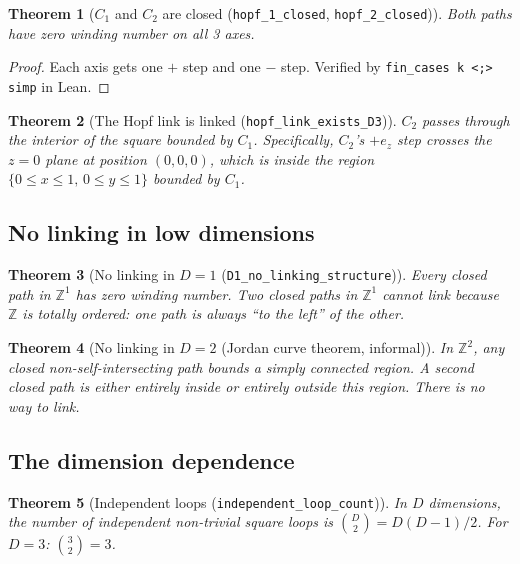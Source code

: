 \documentclass[11pt,a4paper]{article}
\theoremstyle{plain}
\newtheorem{theorem}{Theorem}[section]
\theoremstyle{definition}
\theoremstyle{remark}
\newcommand{\Z}{\mathbb{Z}}
\begin{document}
\begin{theorem}[$C_1$ and $C_2$ are closed {\normalfont(\texttt{hopf\_1\_closed}, \texttt{hopf\_2\_closed})}]
Both paths have zero winding number on all 3 axes.
\end{theorem}

\begin{proof}
Each axis gets one $+$ step and one $-$ step.
Verified by \texttt{fin\_cases k <;> simp} in Lean.
\end{proof}

\begin{theorem}[The Hopf link is linked {\normalfont(\texttt{hopf\_link\_exists\_D3})}]
\label{thm:hopf-linked}
$C_2$ passes through the interior of the square bounded by $C_1$.
Specifically, $C_2$'s $+e_z$ step crosses the $z = 0$ plane at position
$(0, 0, 0)$, which is inside the region $\{0 \leq x \leq 1,\,
0 \leq y \leq 1\}$ bounded by $C_1$.
\end{theorem}

\subsection{No linking in low dimensions}

\begin{theorem}[No linking in $D = 1$ {\normalfont(\texttt{D1\_no\_linking\_structure})}]
Every closed path in $\Z^1$ has zero winding number.
Two closed paths in $\Z^1$ cannot link because $\Z$ is totally ordered:
one path is always ``to the left'' of the other.
\end{theorem}

\begin{theorem}[No linking in $D = 2$ {\normalfont(Jordan curve theorem, informal)}]
In $\Z^2$, any closed non-self-intersecting path bounds a simply connected
region.  A second closed path is either entirely inside or entirely outside
this region.  There is no way to link.
\end{theorem}

\subsection{The dimension dependence}

\begin{theorem}[Independent loops {\normalfont(\texttt{independent\_loop\_count})}]
\label{thm:loop-count}
In $D$ dimensions, the number of independent non-trivial square loops is
$\binom{D}{2} = D(D-1)/2$.  For $D = 3$: $\binom{3}{2} = 3$.
\end{theorem}
\end{document}
